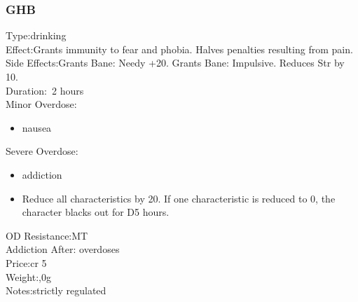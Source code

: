 \subsubsection{GHB}
Type:\tab drinking\\
Effect:\tab Grants immunity to fear and phobia. Halves penalties resulting from pain.\\
Side Effects:\tab Grants Bane: Needy +20. Grants Bane: Impulsive. Reduces Str by 10.\\
Duration:\tab ~2 hours\\
Minor Overdose:\\
\begin{itemize}
	\setlength\itemsep{-8mm}
	\vspace{-12mm}
	\item nausea
\end{itemize}
Severe Overdose:\\
\begin{itemize}
	\setlength\itemsep{-8mm}
	\vspace{-12mm}
	\item addiction
	\item Reduce all characteristics by 20. If one characteristic is reduced to 0, the character blacks out for D5 hours.
\end{itemize}
OD Resistance:\tab MT\\
Addiction After: overdoses\\
Price:\tab cr 5\\
Weight:,0g\\
Notes:\tab strictly regulated


